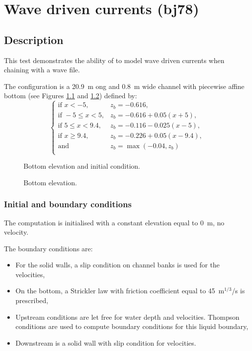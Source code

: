\chapter{Wave driven currents (bj78)}

\section{Description}

This test demonstrates the ability of  to model wave driven currents
when chaining with a wave file.

The configuration is a 20.9~m ong and 0.8~m wide channel with piecewise affine
bottom (see Figures \ref{t2d:bj78:fig:Bathy1D} and \ref{t2d:bj78:fig:Bottom})
defined by:
\begin{equation*}
\left\{
    \begin{array}{rl}
        \textrm{if } x < -5, & z_b = -0.616,\\
        \textrm{if } -5 \le x < 5, & z_b = -0.616 + 0.05(x+5),\\
        \textrm{if }  5 \le x < 9.4, & z_b = -0.116 - 0.025(x-5),\\
        \textrm{if } x \ge 9.4, & z_b = -0.226 + 0.05(x-9.4),\\
        \textrm{and } & z_b = \max(-0.04, z_b)\\
    \end{array}
\right.
\end{equation*}

\begin{figure}[!htbp]
 \centering
 \caption{Bottom elevation and initial condition.}
 \label{t2d:bj78:fig:Bathy1D}
\end{figure}

\begin{figure}[!htbp]
 \centering
 \caption{Bottom elevation.}
 \label{t2d:bj78:fig:Bottom}
\end{figure}

\subsection{Initial and boundary conditions}

The computation is initialised with a constant elevation equal to 0~m,
no velocity.

The boundary conditions are:
\begin{itemize}
\item For the solid walls, a slip condition on channel banks is used for the
velocities,
\item On the bottom, a Strickler law with friction coefficient equal to
45~m$^{1/3}$/s is prescribed,
\item Upstream conditions are let free for water depth and velocities.
Thompson conditions are used to compute boundary conditions for this
liquid boundary,
\item Downstream is a solid wall with slip condition for velocities.
\end{itemize}

